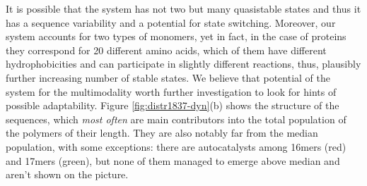 \documentclass[5p,times]{elsarticle}
\begin{document}
It is possible that the system has not two but many quasistable states and thus it has a sequence 
variability and a potential for state switching.
Moreover, our system accounts for two 
types of monomers, yet in fact, in the case of proteins they correspond for 20 different amino 
acids, which of them have different hydrophobicities and can participate in slightly different 
reactions, thus, plausibly further increasing  number of stable states.
We believe that potential of the system for the multimodality worth further investigation to look 
for hints of possible adaptability.
Figure \ref{fig:distr1837-dyn}(b) shows the structure of the sequences, which \textit{most often} 
are main contributors into the total population of the polymers of their length. They are also 
notably far from the median population, with some exceptions: there are autocatalysts 
among 16mers (red) and 17mers (green), but none of them managed to emerge above median and aren't 
shown on the picture.
\end{document}
